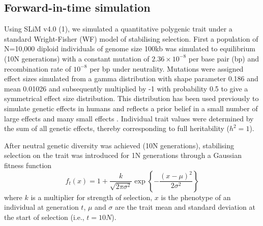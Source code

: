 \documentclass[12pt]{zHenriquesLab-StyleBioRxiv}
\begin{document}
\clearpage \newpage


\subsection*{Forward-in-time simulation} \label{sec:methods:sims} 
Using SLiM v4.0 (1), we simulated a quantitative polygenic trait under
a standard Wright-Fisher (WF) model of stabilising selection. First a
population of N=10,000 diploid individuals of genome size 100kb was simulated to
equilibrium (10N generations) with a constant mutation of
$2.36\times 10^{-8}$ per base pair (bp) and recombination rate of
$10^{-8}$ per bp under neutrality. Mutations were assigned effect
sizes simulated from a gamma distribution with shape parameter 0.186
and mean 0.01026 and subsequently multiplied by -1 with probability
0.5 to give a symmetrical effect size distribution. This distribution
has been used previously to simulate genetic effects in humans and
reflects a prior belief in a small number of large effects and many
small effects \cite{anil3}. Individual trait values were determined by
the sum of all genetic effects, thereby corresponding to full heritability ($h^2 =1$).

After neutral genetic diversity was achieved (10N generations),
stabilising selection on the trait was introduced for 1N
generations through a Gaussian fitness function
\begin{equation} 
  f_t(x) = 1 + \frac{k}{\sqrt{2\pi\sigma^2}} \exp\left\{-\frac{(x-\mu)^2}{2\sigma^2}\right\}
\end{equation}
where $k$ is a multiplier for strength of selection,
$x$ is the phenotype of an individual at generation $t$, $\mu$
and $\sigma$ are the trait mean and standard deviation at the start of
selection (i.e., $t=10N$).
\end{document}
